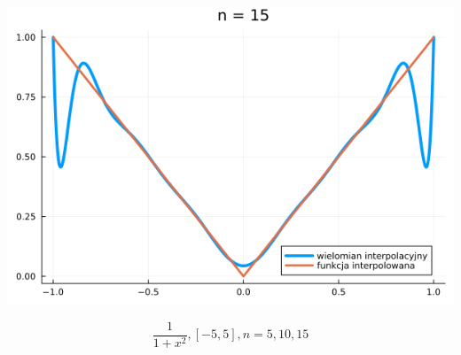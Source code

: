 \documentclass{article}
\begin{document}
\begin{center}
    \includegraphics[scale=0.34]{6a_15.png}
\end{center}

\[
    \frac{1}{1 + x^2}, [-5, 5], n = 5, 10, 15
\]
\end{document}
